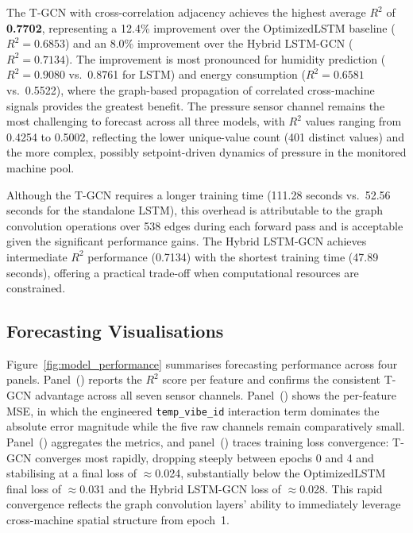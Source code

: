 The T-GCN with cross-correlation adjacency achieves the highest average $R^2$ of \textbf{0.7702}, representing a 12.4\% improvement over the OptimizedLSTM baseline ($R^2 = 0.6853$) and an 8.0\% improvement over the Hybrid LSTM-GCN ($R^2 = 0.7134$). The improvement is most pronounced for humidity prediction ($R^2 = 0.9080$ vs.\ 0.8761 for LSTM) and energy consumption ($R^2 = 0.6581$ vs.\ 0.5522), where the graph-based propagation of correlated cross-machine signals provides the greatest benefit. The pressure sensor channel remains the most challenging to forecast across all three models, with $R^2$ values ranging from 0.4254 to 0.5002, reflecting the lower unique-value count (401 distinct values) and the more complex, possibly setpoint-driven dynamics of pressure in the monitored machine pool.

Although the T-GCN requires a longer training time (111.28 seconds vs.\ 52.56 seconds for the standalone LSTM), this overhead is attributable to the graph convolution operations over 538 edges during each forward pass and is acceptable given the significant performance gains. The Hybrid LSTM-GCN achieves intermediate $R^2$ performance (0.7134) with the shortest training time (47.89 seconds), offering a practical trade-off when computational resources are constrained.

\subsection{Forecasting Visualisations}

Figure~\ref{fig:model_performance} summarises forecasting performance across four panels. Panel~() reports the $R^2$ score per feature and confirms the consistent T-GCN advantage across all seven sensor channels. Panel~() shows the per-feature MSE, in which the engineered \texttt{temp\_vibe\_id} interaction term dominates the absolute error magnitude while the five raw channels remain comparatively small. Panel~() aggregates the metrics, and panel~() traces training loss convergence: T-GCN converges most rapidly, dropping steeply between epochs 0 and 4 and stabilising at a final loss of $\approx$0.024, substantially below the OptimizedLSTM final loss of $\approx$0.031 and the Hybrid LSTM-GCN loss of $\approx$0.028. This rapid convergence reflects the graph convolution layers' ability to immediately leverage cross-machine spatial structure from epoch~1.

